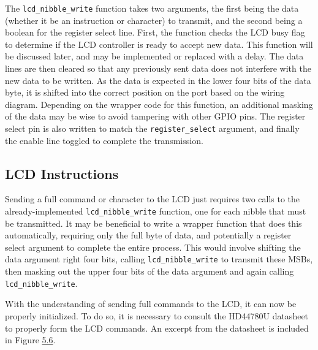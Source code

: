 \documentclass[
  9pt,
  letterpaper,
  abstract,
  titlepage]{scrbook}
\begin{document}
The \texttt{lcd\_nibble\_write} function takes two arguments, the first
being the data (whether it be an instruction or character) to transmit,
and the second being a boolean for the register select line. First, the
function checks the LCD busy flag to determine if the LCD controller is
ready to accept new data. This function will be discussed later, and may
be implemented or replaced with a delay. The data lines are then cleared
so that any previously sent data does not interfere with the new data to
be written. As the data is expected in the lower four bits of the data
byte, it is shifted into the correct position on the port based on the
wiring diagram. Depending on the wrapper code for this function, an
additional masking of the data may be wise to avoid tampering with other
GPIO pins. The register select pin is also written to match the
\texttt{register\_select} argument, and finally the enable line toggled
to complete the transmission.

\subsection{LCD Instructions}\label{lcd-instructions}

Sending a full command or character to the LCD just requires two calls
to the already-implemented \texttt{lcd\_nibble\_write} function, one for
each nibble that must be transmitted. It may be beneficial to write a
wrapper function that does this automatically, requiring only the full
byte of data, and potentially a register select argument to complete the
entire process. This would involve shifting the data argument right four
bits, calling \texttt{lcd\_nibble\_write} to transmit these MSBs, then
masking out the upper four bits of the data argument and again calling
\texttt{lcd\_nibble\_write}.

With the understanding of sending full commands to the LCD, it can now
be properly initialized. To do so, it is necessary to consult the
HD44780U datasheet to properly form the LCD commands. An excerpt from
the datasheet is included in Figure \hyperref[fig:lcdinstructions]{5.6}.
\end{document}
